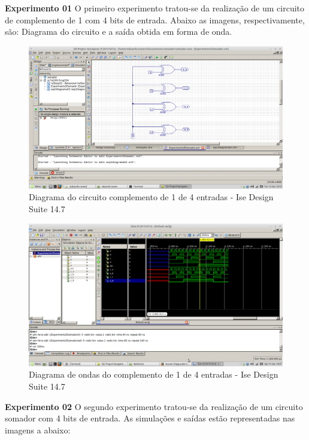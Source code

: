 \documentclass[12pts]{article}
\begin{document}
\textbf{Experimento 01}
\singlespacing
	O primeiro experimento tratou-se da realização de um circuito de complemento de 1 com 4 bits de entrada. Abaixo as imagens, respectivamente, são: Diagrama do circuito e a saída obtida em forma de onda.

\begin{figure}[!htb]
  \centering
  \includegraphics[scale=0.2]{img/complemento01.png}
  \caption{Diagrama do circuito complemento de 1 de 4 entradas - Ise Design Suite 14.7}
  \label{figRotulo}
\end{figure}

\begin{figure}[!htb]
  \centering
  \includegraphics[scale=0.2]{img/saidaComplemento01.png}
  \caption{Diagrama de ondas do complemento de 1 de 4 entradas - Ise Design Suite 14.7}
  \label{figRotulo}
\end{figure}
\newpage

\textbf{Experimento 02}
\singlespacing
O segundo experimento tratou-se da realização de um circuito somador com 4 bits de entrada. As simulações e saídas estão representadas nas imagens a abaixo:
\end{document}
